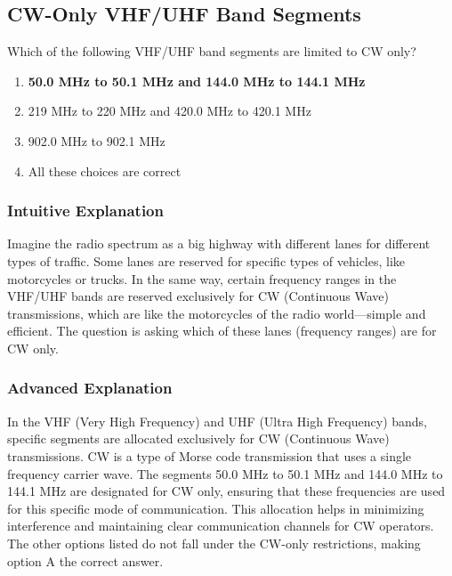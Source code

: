 \subsection{CW-Only VHF/UHF Band Segments}
\label{T1B07}

\begin{tcolorbox}[colback=gray!10!white,colframe=black!75!black,title=T1B07]
Which of the following VHF/UHF band segments are limited to CW only?
\begin{enumerate}[label=\Alph*),noitemsep]
    \item \textbf{50.0 MHz to 50.1 MHz and 144.0 MHz to 144.1 MHz}
    \item 219 MHz to 220 MHz and 420.0 MHz to 420.1 MHz
    \item 902.0 MHz to 902.1 MHz
    \item All these choices are correct
\end{enumerate}
\end{tcolorbox}

\subsubsection{Intuitive Explanation}
Imagine the radio spectrum as a big highway with different lanes for different types of traffic. Some lanes are reserved for specific types of vehicles, like motorcycles or trucks. In the same way, certain frequency ranges in the VHF/UHF bands are reserved exclusively for CW (Continuous Wave) transmissions, which are like the motorcycles of the radio world—simple and efficient. The question is asking which of these lanes (frequency ranges) are for CW only.

\subsubsection{Advanced Explanation}
In the VHF (Very High Frequency) and UHF (Ultra High Frequency) bands, specific segments are allocated exclusively for CW (Continuous Wave) transmissions. CW is a type of Morse code transmission that uses a single frequency carrier wave. The segments 50.0 MHz to 50.1 MHz and 144.0 MHz to 144.1 MHz are designated for CW only, ensuring that these frequencies are used for this specific mode of communication. This allocation helps in minimizing interference and maintaining clear communication channels for CW operators. The other options listed do not fall under the CW-only restrictions, making option A the correct answer.